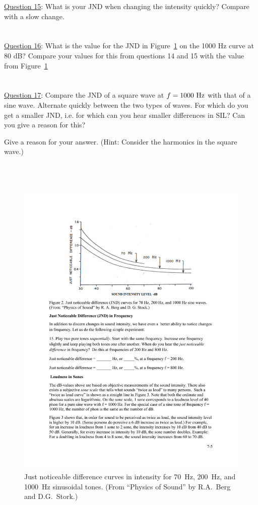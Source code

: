 \documentclass[11pt]{NSF}
\begin{document}
\underline{Question 15}: What is your JND when changing the intensity quickly? Compare with a slow change.
\\
\\
\\

\underline{Question 16}: What is the value for the JND in Figure~\ref{f:2} on the 1000 Hz curve at 80 dB? 
Compare your values for this from questions 14
and 15 with the value from Figure~\ref{f:2}
\\
\\
\\

\underline{Question 17}: Compare the JND of a square wave at $f = 1000~{\rm Hz}$ with that of a sine wave. Alternate
quickly between the two types of waves. For which do you get a smaller JND, i.e. for which can
you hear smaller differences in SIL? Can you give a reason for this? 

Give a reason for your answer. (Hint: Consider the harmonics in the square wave.)
\\
\\
\\
\\

%
\begin{figure}[hbtp]
\begin{center}
\includegraphics[width=.7\textwidth]{fig7_2}
\caption{Just noticeable difference curves in intensity 
for 70~Hz, 200~Hz, and 1000~Hz sinusoidal tones. 
(From ``Physics of Sound” by R.A.~Berg and D.G.~Stork.)}
\label{f:2}
\end{center}
\end{figure}
\end{document}
